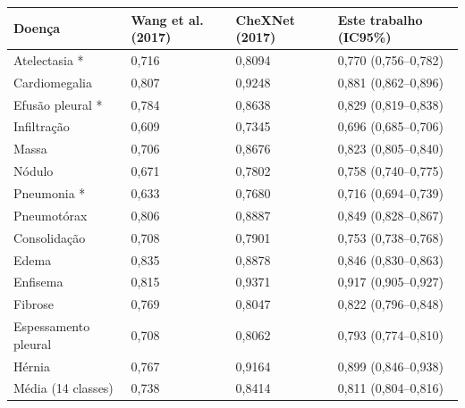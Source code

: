 \begin{tabular}{llll}
\toprule
Doença & Wang et al. (2017) & CheXNet (2017) & Este trabalho (IC95\%) \\
\midrule
Atelectasia * & 0,716 & 0,8094 & 0,770 (0,756–0,782) \\
Cardiomegalia & 0,807 & 0,9248 & 0,881 (0,862–0,896) \\
Efusão pleural * & 0,784 & 0,8638 & 0,829 (0,819–0,838) \\
Infiltração & 0,609 & 0,7345 & 0,696 (0,685–0,706) \\
Massa & 0,706 & 0,8676 & 0,823 (0,805–0,840) \\
Nódulo & 0,671 & 0,7802 & 0,758 (0,740–0,775) \\
Pneumonia * & 0,633 & 0,7680 & 0,716 (0,694–0,739) \\
Pneumotórax & 0,806 & 0,8887 & 0,849 (0,828–0,867) \\
Consolidação & 0,708 & 0,7901 & 0,753 (0,738–0,768) \\
Edema & 0,835 & 0,8878 & 0,846 (0,830–0,863) \\
Enfisema & 0,815 & 0,9371 & 0,917 (0,905–0,927) \\
Fibrose & 0,769 & 0,8047 & 0,822 (0,796–0,848) \\
Espessamento pleural & 0,708 & 0,8062 & 0,793 (0,774–0,810) \\
Hérnia & 0,767 & 0,9164 & 0,899 (0,846–0,938) \\
Média (14 classes) & 0,738 & 0,8414 & 0,811 (0,804–0,816) \\
\bottomrule
\end{tabular}
